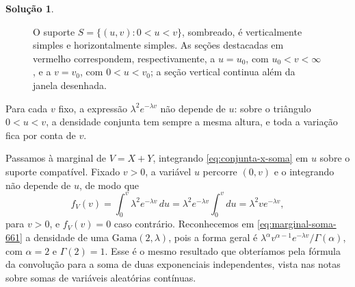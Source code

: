 \documentclass[12pt,portuguese]{article}
\theoremstyle{definition}
\theoremstyle{plainexercise}
\theoremstyle{starredexercise}
\theoremstyle{definition}
\newtheorem*{solution}{Solução}
\begin{document}
\begin{solution}
\begin{figure}[H]
\centering
{}
\caption{O suporte $S=\{(u,v):0<u<v\}$, sombreado, é verticalmente simples e
horizontalmente simples. As seções destacadas em vermelho correspondem, respectivamente,
a $u=u_0$, com $u_0<v<\infty$, e a $v=v_0$, com $0<u<v_0$; a seção vertical continua
além da janela desenhada.}
\label{fig:suporte-transformado}
\end{figure}

Para cada $v$ fixo, a expressão $\lambda^2 e^{-\lambda v}$ não depende de $u$: sobre o
triângulo $0 < u < v$, a densidade conjunta tem sempre a mesma altura, e toda a variação
fica por conta de $v$.

Passamos à marginal de $V = X+Y$, integrando \eqref{eq:conjunta-x-soma} em $u$ sobre o
suporte compatível. Fixado $v > 0$, a variável $u$ percorre $(0,v)$ e o integrando não
depende de $u$, de modo que
\begin{equation}\label{eq:marginal-soma-661}
  f_V(v) = \int_{0}^{v} \lambda^2 e^{-\lambda v}\,du
  = \lambda^2 e^{-\lambda v} \int_{0}^{v} du
  = \lambda^2 v e^{-\lambda v},
\end{equation}
para $v > 0$, e $f_V(v) = 0$ caso contrário. Reconhecemos em \eqref{eq:marginal-soma-661} a
densidade de uma $\mathrm{Gama}(2,\lambda)$, pois a forma geral é
$\lambda^{\alpha} v^{\alpha-1} e^{-\lambda v}/\Gamma(\alpha)$, com $\alpha = 2$ e
$\Gamma(2) = 1$. Esse é o mesmo resultado que obteríamos pela fórmula da convolução para a
soma de duas exponenciais independentes, vista nas notas sobre somas de variáveis aleatórias
contínuas.


\end{solution}
\end{document}
